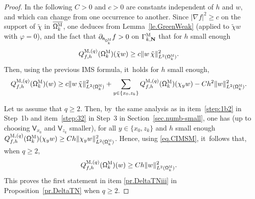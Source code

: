 \documentclass[JEP,XML,SOM,Unicode,NoEqCountersInSection,NoFloatCountersInSection,published]{cedram}
\newcommand{\mbf}[1]{\mathbf{#1}}
\theoremstyle{plain}
\theoremstyle{definition}
\begin{document}
\begin{proof}
In the following $C>0$ and $c>0$ are constants independent of $h$ and $w$, and which can change from one occurrence to another.
Since $\vert \nabla f\vert^2\ge c$ on the support of $\tilde \chi$ in $\overline {\mathsf \Omega_k^{\textsc{M}}}$, one deduces from Lemma~\ref{le.GreenWeak} (applied to $\tilde \chi w$ with $\varphi=0$), and the fact that $\partial_{\mathsf n_{ \mathsf \Omega_k^{\textsc{M}}}}f>0$ on $\Gamma_{k,\mbf N}^{\textsc{M}}$ that for $h$ small enough
\[
Q_{f,h}^{\textsc{M},(q)}(\mathsf \Omega_k^{\textsc{M}})(\tilde \chi w) \ge c \Vert w\, \tilde \chi \Vert_{L^2(\mathsf \Omega_k^{\textsc{M}})}^2.
\]
Then, using the previous IMS formula, it~holds for $h$ small enough,
\begin{equation}\label{eq.CIMSM}
Q_{f,h}^{\textsc{M},(q)}(\mathsf \Omega_k^{\textsc{M}})(w)\ge c \Vert w\, \tilde \chi \Vert_{L^2(\mathsf \Omega_k^{\textsc{M}})}^2 + \sum_{y\in \{x_0,z_k\}} Q_{f,h}^{\textsc{M},(q)}(\mathsf \Omega_k^{\textsc{M}})(\chi_y w) -C h^2 \Vert w \Vert_{L^2(\mathsf \Omega_k^{\textsc{M}})}^2.
\end{equation}

Let us assume that $q\ge 2$. Then, by~the same analysis as in item~\eqref{step:1b2} in Step~1b and item~\eqref{step:32} in Step~3 in Section~\ref{sec.numb-small}, one has (up to choosing $\mathsf V_{x_0}$ and $\mathsf V_{z_k}$ smaller), for all $y \in \{x_0,z_k\}$ and $h$ small enough
$ Q_{f,h}^{\textsc{M},(q)}(\mathsf \Omega_k^{\textsc{M}})(\chi_y w)\ge Ch \Vert \chi_yw \Vert_{L^2(\mathsf \Omega_k^{\textsc{M}})}^2$.
Hence, using \eqref{eq.CIMSM}, it~follows that, when $q\ge 2$,
\[
Q_{f,h}^{\textsc{M},(q)}(\mathsf \Omega_k^{\textsc{M}})(w)\ge Ch \Vert w \Vert_{L^2(\mathsf \Omega_k^{\textsc{M}})}^2.
\]
This proves the first statement in item \eqref{pr.DeltaTNiii} in Proposition~\ref{pr.DeltaTN} when $q\ge 2$.


\end{proof}
\end{document}
